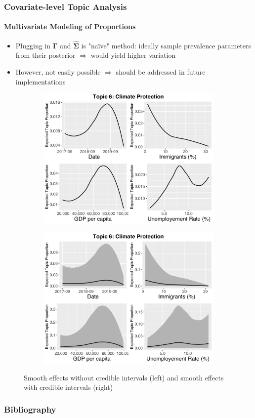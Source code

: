 \documentclass[xcolor=dvipsnames]{beamer}
\begin{document}
\begin{frame}
\frametitle{Covariate-level Topic Analysis}
\framesubtitle{Multivariate Modeling of Proportions}
\begin{itemize}
\item Plugging in $\boldsymbol{\Gamma}$ and $\hat{\boldsymbol{\Sigma}}$ is "na{\"i}ve" method: ideally sample prevalence parameters from their posterior $\Rightarrow$ would yield higher variation
\item However, not easily possible $\Rightarrow$ should be addressed in future implementations
\end{itemize}
\begin{figure}[h!]
  \centering
  \captionsetup{justification=centering}
  \begin{subfigure}[b]{0.4\linewidth}
    \includegraphics[width=\linewidth]{../../plots/presentation/direct_t6_without_credible.pdf}
  \end{subfigure}
  \begin{subfigure}[b]{0.4\linewidth}
    \includegraphics[width=\linewidth]{../../plots/presentation/direct_t6_with_credible.pdf}
  \end{subfigure}
  \caption{Smooth effects without credible intervals (left) and smooth effects with credible intervals (right)}
  \label{fig:directassessment}
\end{figure}
\end{frame}

\begin{frame}
\frametitle{Bibliography}
\printbibliography
\end{frame}
\end{document}
